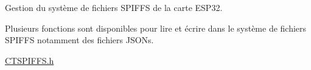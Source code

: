 Gestion du système de fichiers SPIFFS de la carte ESP32.

Plusieurs fonctions sont disponibles pour lire et écrire dans le système de fichiers SPIFFS notamment des fichiers JSONs.

\mbox{\hyperlink{_c_t_s_p_i_f_f_s_8h}{CTSPIFFS.\+h}} 